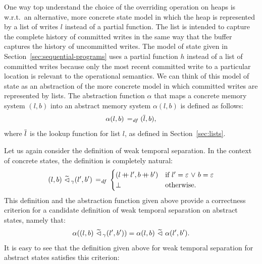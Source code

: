 \documentclass[11pt]{report}
\begin{document}
One way top understand the choice of the overriding operation on heaps is w.r.t.\ an alternative, more concrete state model in which the heap is represented by a list of writes $l$ instead of a partial function. The list is intended to capture the complete history of committed writes in the same way that the buffer captures the history of uncommitted writes. The model of state given in Section~\ref{sec:sequential-programs} uses a partial function $h$ instead of a list of committed writes because only the most recent committed write to a particular location is relevant to the operational semantics. We can think of this model of state as an abstraction of the more concrete model in which committed writes are represented by lists. The abstraction function $\alpha$ that maps a concrete memory system $(l,b)$ into an abstract memory system $\alpha(l,b)$ is defined as follows:  \[ \alpha(l,b) \operatorname{\;=_{\mathit{df}}\;} (\overline{l},b),\] where $\overline{l}$ is the lookup function for list $l$, as defined in Section~\ref{sec:lists}. 

Let us again consider the definition of weak temporal separation. In the context of concrete states, the definition is completely natural: \[ (l,b) \operatorname{\,\widetilde{\vartriangleleft}\,}_\gamma (l',b') \operatorname{\;=_{\mathit{df}}\;} \begin{cases}
(l \operatorname{+\!\!\!+} l', b \operatorname{+\!\!\!+} b') & \text{if $l' = \varepsilon \operatorname{\,\vee\,} b = \varepsilon$} \\
\bot & \text{otherwise.}
\end{cases} \] This definition and the abstraction function given above provide a correctness criterion for a candidate definition of weak temporal separation on abstract states, namely that: \[ \alpha((l,b) \operatorname{\,\widetilde{\vartriangleleft}\,}_\gamma (l',b')) = \alpha(l,b) \operatorname{\,\widetilde{\vartriangleleft}\,} \alpha(l',b').\] It is easy to see that the definition given above for weak temporal separation for abstract states satisfies this criterion: 
\end{document}
